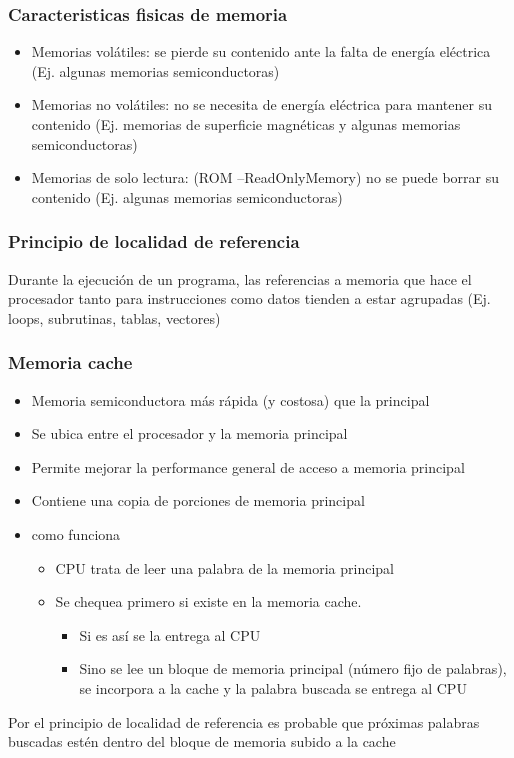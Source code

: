 \subsubsection{Caracteristicas fisicas de memoria}
	\begin{itemize}
	\item Memorias volátiles: se pierde su contenido ante la falta de energía eléctrica (Ej. algunas memorias semiconductoras)
	\item Memorias no volátiles: no se necesita de energía eléctrica para mantener su contenido (Ej. memorias de superficie magnéticas y algunas memorias semiconductoras)
	\item Memorias de solo lectura: (ROM –ReadOnlyMemory) no se puede borrar su contenido (Ej. algunas memorias semiconductoras)
	\end{itemize}
	
\subsubsection{Principio de localidad de referencia}
Durante la ejecución de un programa, las referencias a memoria que hace el procesador tanto para instrucciones como datos tienden a estar agrupadas	(Ej. loops, subrutinas, tablas, vectores)


\subsubsection{Memoria cache}
	\begin{itemize}
	\item Memoria semiconductora más rápida (y costosa) que la principal
	\item Se ubica entre el procesador y la memoria principal
	\item Permite mejorar la performance general de acceso a memoria principal
	\item Contiene una copia de porciones de memoria principal
	\item como funciona
		\begin{itemize}
		\item CPU trata de leer una palabra de la memoria principal
		\item Se chequea primero si existe en la memoria cache.
			\begin{itemize}
			\item Si es así se la entrega al CPU
			\item Sino se lee un bloque de memoria principal (número fijo de palabras), se incorpora a la cache y la palabra buscada se entrega al CPU
			\end{itemize}
		\end{itemize}
	\end{itemize}
	Por el principio de localidad de referencia es probable que próximas palabras buscadas estén dentro del bloque de memoria subido a la cache
	
